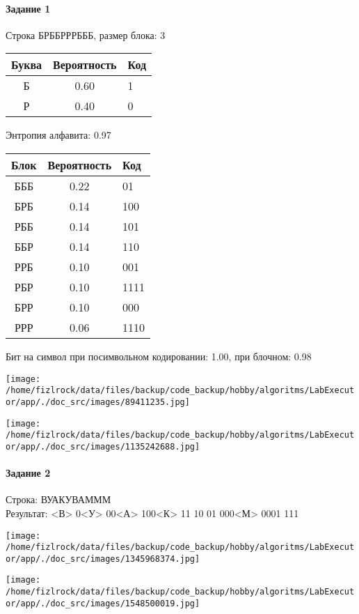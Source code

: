 \documentclass[a4paper, 12pt]{article}
\begin{document}
\paragraph{Задание 1}

Строка БРББРРРБББ, размер блока: 3
\begin{center}
 \begin{tabular}{ |c|c|l| } 
  \hline
     Буква & Вероятность & Код\\ \hline
Б & 0.60 & 1\\\hline
Р & 0.40 & 0
\\ \hline \end{tabular}
\end{center}
Энтропия алфавита: 0.97
\begin{center}
 \begin{tabular}{ |c|c|l| } 
  \hline
     Блок & Вероятность & Код\\ \hline
БББ & 0.22 & 01\\\hline
БРБ & 0.14 & 100\\\hline
РББ & 0.14 & 101\\\hline
ББР & 0.14 & 110\\\hline
РРБ & 0.10 & 001\\\hline
РБР & 0.10 & 1111\\\hline
БРР & 0.10 & 000\\\hline
РРР & 0.06 & 1110
\\ \hline \end{tabular}
\end{center}
Бит на символ при посимвольном кодировании: 1.00, при блочном: 0.98

\texttt{[image: /home/fizlrock/data/files/backup/code\_backup/hobby/algoritms/LabExecutor/app/./doc\_src/images/89411235.jpg]}

\texttt{[image: /home/fizlrock/data/files/backup/code\_backup/hobby/algoritms/LabExecutor/app/./doc\_src/images/1135242688.jpg]}
\pagebreak
\paragraph{Задание 2}

Строка: 
ВУАКУВАМММ\\
Результат: <В> 0<У> 00<А> 100<К> 11 10 01 000<М> 0001 111

\texttt{[image: /home/fizlrock/data/files/backup/code\_backup/hobby/algoritms/LabExecutor/app/./doc\_src/images/1345968374.jpg]}

\texttt{[image: /home/fizlrock/data/files/backup/code\_backup/hobby/algoritms/LabExecutor/app/./doc\_src/images/1548500019.jpg]}
\end{document}

